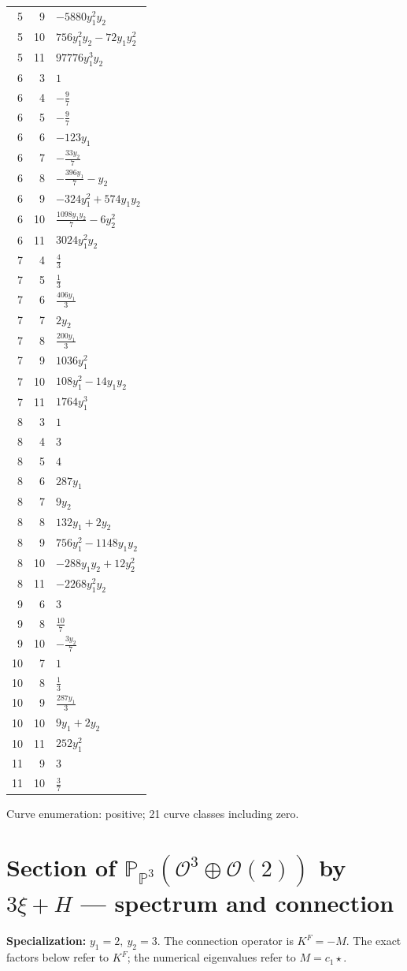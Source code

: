 \documentclass[10pt,a4paper]{article}
\begin{document}
{\begin{longtable}{rrp{125mm}}
5 & 9 & $- 5880 y_{1}^{2} y_{2}$\\
5 & 10 & $756 y_{1}^{2} y_{2} - 72 y_{1} y_{2}^{2}$\\
5 & 11 & $97776 y_{1}^{3} y_{2}$\\
6 & 3 & $1$\\
6 & 4 & $- \frac{9}{7}$\\
6 & 5 & $- \frac{9}{7}$\\
6 & 6 & $- 123 y_{1}$\\
6 & 7 & $- \frac{33 y_{2}}{7}$\\
6 & 8 & $- \frac{396 y_{1}}{7} - y_{2}$\\
6 & 9 & $- 324 y_{1}^{2} + 574 y_{1} y_{2}$\\
6 & 10 & $\frac{1098 y_{1} y_{2}}{7} - 6 y_{2}^{2}$\\
6 & 11 & $3024 y_{1}^{2} y_{2}$\\
7 & 4 & $\frac{4}{3}$\\
7 & 5 & $\frac{1}{3}$\\
7 & 6 & $\frac{406 y_{1}}{3}$\\
7 & 7 & $2 y_{2}$\\
7 & 8 & $\frac{200 y_{1}}{3}$\\
7 & 9 & $1036 y_{1}^{2}$\\
7 & 10 & $108 y_{1}^{2} - 14 y_{1} y_{2}$\\
7 & 11 & $1764 y_{1}^{3}$\\
8 & 3 & $1$\\
8 & 4 & $3$\\
8 & 5 & $4$\\
8 & 6 & $287 y_{1}$\\
8 & 7 & $9 y_{2}$\\
8 & 8 & $132 y_{1} + 2 y_{2}$\\
8 & 9 & $756 y_{1}^{2} - 1148 y_{1} y_{2}$\\
8 & 10 & $- 288 y_{1} y_{2} + 12 y_{2}^{2}$\\
8 & 11 & $- 2268 y_{1}^{2} y_{2}$\\
9 & 6 & $3$\\
9 & 8 & $\frac{10}{7}$\\
9 & 10 & $- \frac{3 y_{2}}{7}$\\
10 & 7 & $1$\\
10 & 8 & $\frac{1}{3}$\\
10 & 9 & $\frac{287 y_{1}}{3}$\\
10 & 10 & $9 y_{1} + 2 y_{2}$\\
10 & 11 & $252 y_{1}^{2}$\\
11 & 9 & $3$\\
11 & 10 & $\frac{3}{7}$\\
\end{longtable}}
Curve enumeration: positive; 21 curve classes including zero.
\clearpage\section*{Section of $\mathbb P_{\mathbb P^{3}}(\mathcal O^{3}\oplus \mathcal O(2))$ by $3\xi +H$ --- spectrum and connection}
\textbf{Specialization:} $y_1=2,\ y_2=3$. The connection operator is $K^F=-M$. The exact factors below refer to $K^F$; the numerical eigenvalues refer to $M=c_1\star$.
\end{document}
